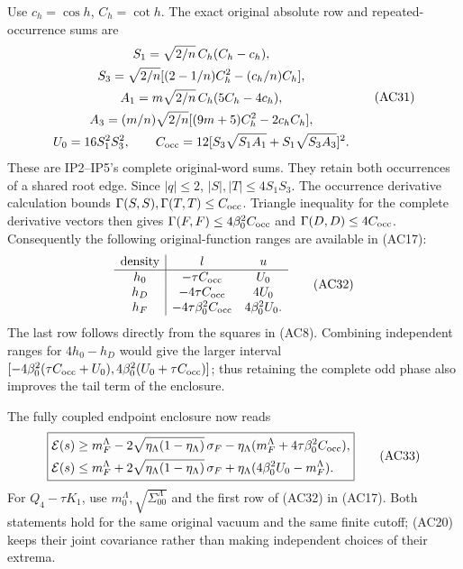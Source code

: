 \documentclass[11pt]{article}
\begin{document}
Use \(c_h=\cos h\), \(C_h=\cot h\). The exact original absolute row and repeated-occurrence sums are
\[
 \begin{gathered}
 S_1=\sqrt{2/n}\,C_h(C_h-c_h),\\
 S_3=\sqrt{2/n}[(2-1/n)C_h^2-(c_h/n)C_h],\\
 A_1=m\sqrt{2/n}\,C_h(5C_h-4c_h),\\
 A_3=(m/n)\sqrt{2/n}[(9m+5)C_h^2-2c_hC_h],\\
 U_0=16S_1^2S_3^2,\qquad
 C_{\rm occ}=12[S_3\sqrt{S_1A_1}+S_1\sqrt{S_3A_3}]^2 .
 \end{gathered}\tag{AC31}
\]
These are IP2–IP5's complete original-word sums. They retain both occurrences of a shared root edge. Since \(|q|\le2\), \(|S|,|T|\le4S_1S_3\). The occurrence derivative calculation bounds \(\Gamma(S,S),\Gamma(T,T)\le C_{\rm occ}\). Triangle inequality for the complete derivative vectors then gives \(\Gamma(F,F)\le4\beta_0^2C_{\rm occ}\) and \(\Gamma(D,D)\le4C_{\rm occ}\). Consequently the following original-function ranges are available in (AC17):
\[
 \begin{array}{c|cc}
 \text{density}&l&u\\ \hline
 h_0&-\tau C_{\rm occ}&U_0\\
 h_D&-4\tau C_{\rm occ}&4U_0\\
 h_F&-4\tau\beta_0^2C_{\rm occ}&4\beta_0^2U_0 .
 \end{array}\tag{AC32}
\]
The last row follows directly from the squares in (AC8). Combining independent ranges for \(4h_0-h_D\) would give the larger interval
\([-4\beta_0^2(\tau C_{\rm occ}+U_0),4\beta_0^2(U_0+\tau C_{\rm occ})]\);
thus retaining the complete odd phase also improves the tail term of the enclosure.

The fully coupled endpoint enclosure now reads
\[
 \boxed{\begin{aligned}
 \mathcal E(s)&\ge m_F^\Lambda
 -2\sqrt{\eta_\Lambda(1-\eta_\Lambda)}\,\sigma_F
 -\eta_\Lambda(m_F^\Lambda+4\tau\beta_0^2C_{\rm occ}),\\
 \mathcal E(s)&\le m_F^\Lambda
 +2\sqrt{\eta_\Lambda(1-\eta_\Lambda)}\,\sigma_F
 +\eta_\Lambda(4\beta_0^2U_0-m_F^\Lambda).
 \end{aligned}}\tag{AC33}
\]
For \(Q_4-\tau K_1\), use \(m_0^\Lambda,\sqrt{\Sigma_{00}^\Lambda}\) and the first row of (AC32) in (AC17). Both statements hold for the same original vacuum and the same finite cutoff; (AC20) keeps their joint covariance rather than making independent choices of their extrema.
\end{document}
